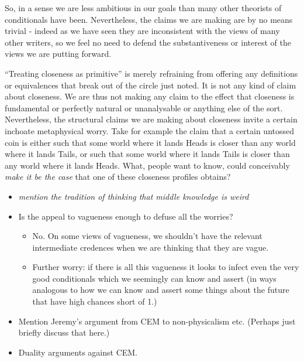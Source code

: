 \documentclass[If.tex]{subfiles}
\begin{document}
So, in a sense we are less ambitious in our goals than many other theorists of conditionals have been. Nevertheless, the claims we are making are by no means trivial - indeed as we have seen they are inconsistent with the views of many other writers, so we feel no need to defend the substantiveness or interest of the views we are putting forward.

“Treating closeness as primitive” is merely refraining from offering any definitions or equivalences that break out of the circle just noted. It is not any kind of claim about closeness. We are thus not making any claim to the effect that closeness is fundamental or perfectly natural or unanalysable or anything else of the sort. Nevertheless, the structural claims we are making about closeness invite a certain inchoate metaphysical worry. Take for example the claim that a certain untossed coin is either such that some world where it lands Heads is closer than any world where it lands Tails, or such that some world where it lands Tails is closer than any world where it lands Heads. What, people want to know, could conceivably \emph{make it be the case} that one of these closeness profiles obtains?

\begin{itemize}
	\item
	\emph{mention the tradition of thinking that middle knowledge is weird}
	\item
	Is the appeal to vagueness enough to defuse all the worries?
	\begin{itemize}
		\item
		No. On some views of vagueness, we shouldn't have the relevant
		intermediate credences when we are thinking that they are vague.\\
		\item
		Further worry: if there is all this vagueness it looks to infect
		even the very good conditionals which we seemingly can know and
		assert (in ways analogous to how we can know and assert some
		things about the future that have high chances short of 1.)
	\end{itemize}
	\item
	Mention Jeremy's argument from CEM to non-physicalism etc. (Perhaps
	just briefly discuss that here.)
	\item
	Duality arguments against CEM.
\end{itemize}
\end{document}
